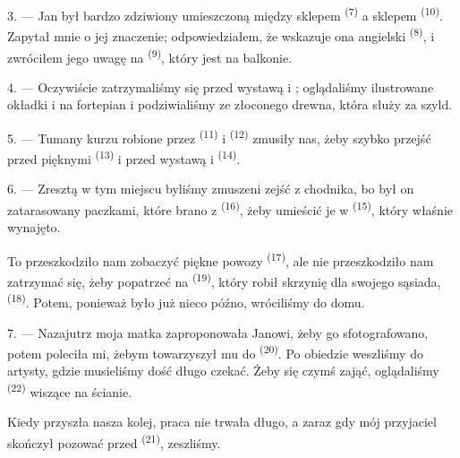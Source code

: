 3. --- Jan był bardzo zdziwiony  umieszczoną między sklepem
 \textsuperscript{(7)} a sklepem 
\textsuperscript{(10)}. Zapytał mnie o jej znaczenie; odpowiedziałem, że wskazuje ona
angielski  \textsuperscript{(8)}, i zwróciłem jego uwagę na
 \textsuperscript{(9)}, który jest na balkonie.

\VUsaut{3.0mm}

4. --- Oczywiście zatrzymaliśmy się przed wystawą 
  i ; oglądaliśmy ilustrowane
okładki  i  na fortepian i podziwialiśmy
 ze złoconego drewna, która służy za szyld.

5. --- Tumany kurzu robione przez  \textsuperscript{(11)} i
 \textsuperscript{(12)} zmusiły nas, żeby szybko przejść przed
pięknymi   \textsuperscript{(13)} i
przed wystawą  i  
\textsuperscript{(14)}.

6. --- Zresztą w tym miejscu byliśmy zmuszeni zejść z chodnika, bo był on zatarasowany
paczkami, które brano z  \textsuperscript{(16)}, żeby
umieścić je w  \textsuperscript{(15)}, który właśnie wynajęto.

To przeszkodziło nam zobaczyć piękne powozy  \textsuperscript{(17)},
ale nie przeszkodziło nam zatrzymać się, żeby popatrzeć na 
\textsuperscript{(19)}, który robił skrzynię dla swojego sąsiada,  \textsuperscript{(18)}. Potem, ponieważ było już nieco późno,
wróciliśmy do domu.

\VUsaut{3.0mm}

7. --- Nazajutrz moja matka zaproponowała Janowi, żeby go sfotografowano, potem poleciła
mi, żebym towarzyszył mu do  \textsuperscript{(20)}. Po obiedzie
weszliśmy do  artysty, gdzie musieliśmy dość długo czekać. Żeby się
czymś zająć, oglądaliśmy  \textsuperscript{(22)} wiszące na ścianie.

Kiedy przyszła nasza kolej, praca nie trwała długo, a zaraz gdy mój przyjaciel skończył
pozować przed  \textsuperscript{(21)}, zeszliśmy.

